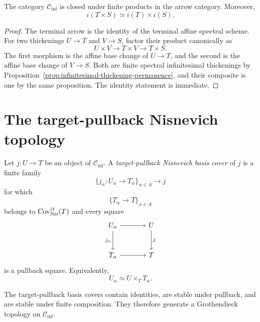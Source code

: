 \begin{proposition}
\label{prop:infinitesimal-products}
The category $\mathcal C_{\mathrm{inf}}$ is closed under finite products in
the arrow category.  Moreover,
\[
    i(T\times S)\simeq i(T)\times i(S).
\]
\end{proposition}

\begin{proof}
The terminal arrow is the identity of the terminal affine spectral scheme.
For two thickenings $U\to T$ and $V\to S$, factor their product canonically as
\[
    U\times V
    \longrightarrow
    T\times V
    \longrightarrow
    T\times S.
\]
The first morphism is the affine base change of \(U\to T\), and the second is
the affine base change of \(V\to S\).  Both are finite spectral infinitesimal
thickenings by
Proposition~\ref{prop:infinitesimal-thickening-permanence}, and their
composite is one by the same proposition.  The identity statement is
immediate.
\end{proof}

\section{The target-pullback Nisnevich topology}
\label{sec:infinitesimal-target-pullback-topology}

\begin{definition}
\label{def:infinitesimal-target-pullback-cover}
Let $j:U\to T$ be an object of $\mathcal C_{\mathrm{inf}}$.  A
\emph{target-pullback Nisnevich basis cover} of $j$ is a finite family
\[
    \{j_\alpha:U_\alpha\longrightarrow T_\alpha\}_{\alpha\in A}
    \longrightarrow
    j
\]
for which
\[
    \{T_\alpha\longrightarrow T\}_{\alpha\in A}
\]
belongs to $\operatorname{Cov}^{\acute et}_{\mathrm{Nis}}(T)$ and every square
\[
\begin{tikzcd}[column sep=large,row sep=large]
    U_\alpha \ar[r] \ar[d,"j_\alpha"']
        & U \ar[d,"j"]\\
    T_\alpha \ar[r]
        & T
\end{tikzcd}
\]
is a pullback square.  Equivalently,
\[
    U_\alpha\simeq U\times_TT_\alpha.
\]
\end{definition}

\begin{proposition}
\label{prop:infinitesimal-target-pullback-pretopology}
The target-pullback basis covers contain identities, are stable under
pullback, and are stable under finite composition.  They therefore generate
a Grothendieck topology on $\mathcal C_{\mathrm{inf}}$.
\end{proposition}

